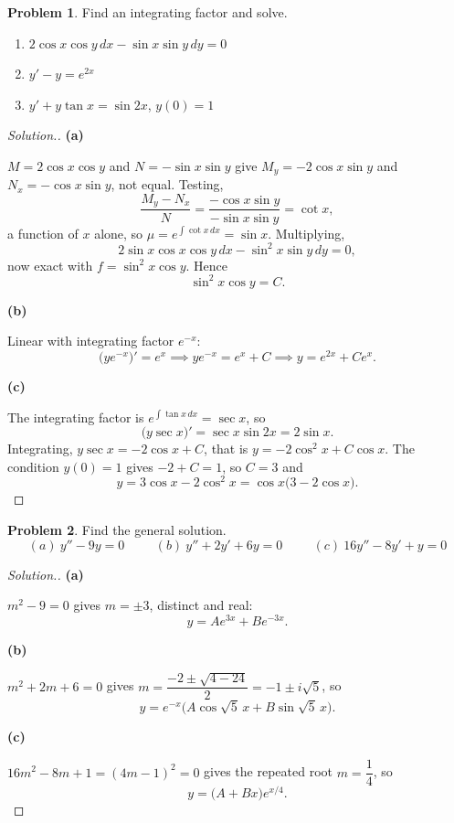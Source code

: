 \documentclass[11pt,a4paper]{article}
\theoremstyle{definition}
\newtheorem{problemx}{Problem}[subsection]
\newenvironment{problem}{\begin{problemx}}{\end{problemx}}
\newenvironment{solution}
  {\renewcommand{\qedsymbol}{}\begin{proof}[\textit{Solution}.]}
  {\end{proof}}
\newcommand{\subhead}[1]{%
  \par\medskip\noindent\textbf{#1}\par\nobreak\smallskip}
\begin{document}
\begin{problem}
Find an integrating factor and solve.
\begin{enumerate}
\item[(a)] $2\cos x\cos y\,dx - \sin x\sin y\,dy = 0$
\item[(b)] $y' - y = e^{2x}$
\item[(c)] $y' + y\tan x = \sin 2x$, $y(0) = 1$
\end{enumerate}
\end{problem}
\begin{solution}
\subhead{(a)}
$M = 2\cos x\cos y$ and $N = -\sin x\sin y$ give
$M_y = -2\cos x\sin y$ and $N_x = -\cos x\sin y$, not equal. Testing,
$$\frac{M_y-N_x}{N} = \frac{-\cos x\sin y}{-\sin x\sin y} = \cot x ,$$
a function of $x$ alone, so
$\mu = e^{\int\cot x\,dx} = \sin x$. Multiplying,
$$2\sin x\cos x\cos y\,dx - \sin^2x\sin y\,dy = 0 ,$$
now exact with $f = \sin^2x\cos y$. Hence
$$\sin^2x\cos y = C .$$

\subhead{(b)}
Linear with integrating factor $e^{-x}$:
$$\big(ye^{-x}\big)' = e^{x} \implies ye^{-x} = e^x + C
\implies y = e^{2x} + Ce^{x}.$$

\subhead{(c)}
The integrating factor is
$e^{\int\tan x\,dx} = \sec x$, so
$$\big(y\sec x\big)' = \sec x\sin 2x = 2\sin x .$$
Integrating, $y\sec x = -2\cos x + C$, that is
$y = -2\cos^2x + C\cos x$. The condition $y(0)=1$ gives $-2+C = 1$, so $C=3$ and
$$y = 3\cos x - 2\cos^2 x = \cos x\big(3-2\cos x\big).$$
\end{solution}

\begin{problem}
Find the general solution.
$$(a)\ y''-9y = 0\hspace{1cm}(b)\ y''+2y'+6y = 0\hspace{1cm}
(c)\ 16y''-8y'+y = 0$$
\end{problem}
\begin{solution}
\subhead{(a)} $m^2-9 = 0$ gives $m = \pm 3$, distinct and real:
$$y = Ae^{3x} + Be^{-3x}.$$

\subhead{(b)} $m^2+2m+6 = 0$ gives
$m = \dfrac{-2\pm\sqrt{4-24}}{2} = -1\pm i\sqrt5$, so
$$y = e^{-x}\Big(A\cos\sqrt5\,x + B\sin\sqrt5\,x\Big).$$

\subhead{(c)} $16m^2-8m+1 = (4m-1)^2 = 0$ gives the repeated root
$m = \dfrac14$, so
$$y = \big(A+Bx\big)e^{x/4}.$$
\end{solution}
\end{document}
